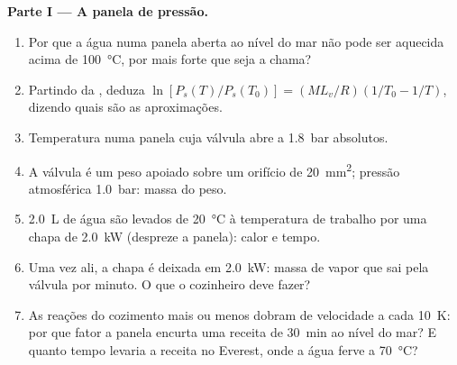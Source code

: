 \begin{problem}
\medskip
\noindent\textbf{Parte I --- A panela de pressão.}
\begin{enumerate}
  \item Por que a água numa panela aberta ao nível do mar não pode ser
        aquecida acima de \qty{100}{\degreeCelsius}, por mais forte que seja a chama?
  \item Partindo da , deduza
        $\ln[P_s(T)/P_s(T_0)] = (ML_v/R)(1/T_0 - 1/T)$, dizendo quais são as
        aproximações.
  \item Temperatura numa panela cuja válvula abre a \qty{1.8}{bar}
        absolutos.
  \item A válvula é um peso apoiado sobre um orifício de \qty{20}{mm^2};
        pressão atmosférica \qty{1.0}{bar}: massa do peso.
  \item \qty{2.0}{L} de água são levados de \qty{20}{\degreeCelsius} à
        temperatura de trabalho por uma chapa de \qty{2.0}{kW} (despreze a panela):
        calor e tempo.
  \item Uma vez ali, a chapa é deixada em \qty{2.0}{kW}: massa de vapor
        que sai pela válvula por minuto. O que o cozinheiro deve fazer?
  \item As reações do cozimento mais ou menos dobram de velocidade a cada \qty{10}{K}:
        por que fator a panela encurta uma receita de \qty{30}{min} ao nível
        do mar? E quanto tempo levaria a receita no Everest, onde a
        água ferve a \qty{70}{\degreeCelsius}?
\end{enumerate}


\end{problem}
